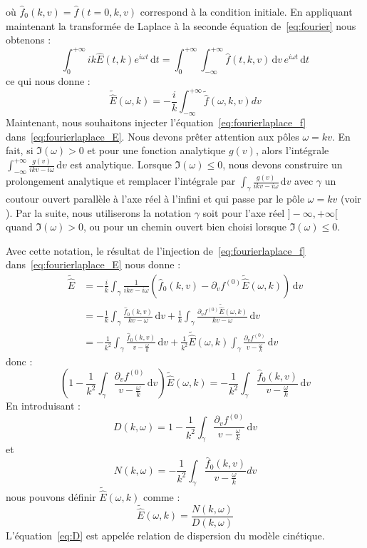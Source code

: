 où $\hat{f}_0(k,v) = \hat{f}(t=0,k,v)$ correspond à la condition initiale. En appliquant maintenant la transformée de Laplace à la seconde équation de~\eqref{eq:fourier} nous obtenons :
$$
  \int_0^{+\infty}ik\hat{E}(t,k)e^{i\omega t}\,\mathrm{d}t = \int_0^{+\infty}\int_{-\infty}^{+\infty}\hat{f}(t,k,v)\,\mathrm{d}v\,e^{i\omega t}\,\mathrm{d}t
$$
ce qui nous donne :
\begin{equation}
  \tilde{\hat{E}}(\omega,k)=-\frac{i}{k}\int_{-\infty}^{+\infty}\tilde{\hat{f}}(\omega,k,v)dv
  \label{eq:fourierlaplace_E}
\end{equation}
Maintenant, nous souhaitons injecter l'équation~\eqref{eq:fourierlaplace_f} dans~\eqref{eq:fourierlaplace_E}. Nous devons prêter attention aux pôles $\omega = kv$. En fait, si $\Im(\omega)>0$ et pour une fonction analytique $g(v)$, alors l'intégrale $\int_{-\infty}^{+\infty}\frac{g(v)}{ikv-i\omega}\,\mathrm{d}v$ est analytique. Lorsque $\Im(\omega) \leq 0$, nous devons construire un prolongement analytique et remplacer l'intégrale par $\int_\gamma \frac{g(v)}{ikv-i\omega}\,\mathrm{d}v$ avec $\gamma$ un coutour ouvert parallèle à l'axe réel à l'infini et qui passe par le pôle $\omega = kv$ (voir \cite{Sonnendrucker:2015}). Par la suite, nous utiliserons la notation $\gamma$ soit pour l'axe réel $]-\infty,+\infty[$ quand $\Im(\omega)>0$, ou pour un chemin ouvert bien choisi lorsque $\Im(\omega)\leq 0$. 

Avec cette notation, le résultat de l'injection de~\eqref{eq:fourierlaplace_f} dans~\eqref{eq:fourierlaplace_E} nous donne :
$$
  \begin{aligned}
    \tilde{\hat{E}}
    & = -\frac{i}{k}\int_\gamma \frac{1}{ikv-i\omega}\left( \hat{f}_0(k,v) - \partial_vf^{(0)}\tilde{\hat{E}}(\omega,k) \right)\,\mathrm{d}v \\
    & = -\frac{1}{k}\int_\gamma \frac{\hat{f}_0(k,v)}{kv-\omega}\,\mathrm{d}v + \frac{1}{k}\int_\gamma \frac{\partial_v f^{(0)}\tilde{\hat{E}}(\omega,k)}{kv-\omega}\,\mathrm{d}v \\
    & = - \frac{1}{k^2}\int_\gamma \frac{\hat{f}_0(k,v)}{v-\frac{\omega}{k}}\,\mathrm{d}v + \frac{1}{k^2}\tilde{\hat{E}}(\omega,k)\int_\gamma \frac{\partial_v f^{(0)}}{v-\frac{\omega}{k}}\,\mathrm{d}v
  \end{aligned}
$$
donc :
$$
  \left( 1 - \frac{1}{k^2}\int_\gamma \frac{\partial_v f^{(0)}}{v-\frac{\omega}{k}}\,\mathrm{d}v \right) \tilde{\hat{E}}(\omega,k) = -\frac{1}{k^2}\int_\gamma \frac{\hat{f}_0(k,v)}{v-\frac{\omega}{k}}\,\mathrm{d}v
$$
En introduisant :
\begin{equation}
  D(k,\omega) = 1 - \frac{1}{k^2}\int_\gamma \frac{\partial_v f^{(0)}}{v-\frac{\omega}{k}}\,\mathrm{d}v
  \label{eq:D}
\end{equation}
et
\begin{equation}
  N(k,\omega) = -\frac{1}{k^2}\int_\gamma\frac{\hat{f}_0(k,v)}{v-\frac{\omega}{k}}dv
  \label{eq:N}
\end{equation}
nous pouvons définir $\tilde{\hat{E}}(\omega,k)$ comme :
$$
  \tilde{\hat{E}}(\omega,k) = \frac{N(k,\omega)}{D(k,\omega)}
$$
L'équation~\eqref{eq:D} est appelée relation de dispersion du modèle cinétique.

